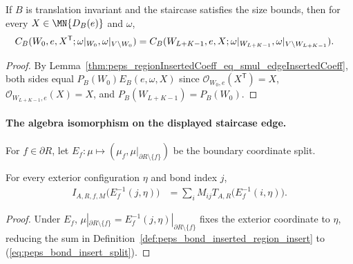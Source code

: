\begin{lemma}%
    \label{thm:peps_end_window_identity_staircase_virtual_operation}
    \leanok
    If $B$ is translation invariant and the staircase satisfies the size bounds,
    then for every $X\in\MN{D_B(e)}$ and $\omega$,
    \begin{align}
        C_B(W_0,e,X^{\mathsf T};\omega|_{W_0},
        \omega|_{V\setminus W_0})
         & =
        C_B(W_{L+K-1},e,X;\omega|_{W_{L+K-1}},
        \omega|_{V\setminus W_{L+K-1}}).
        \notag
    \end{align}
\end{lemma}
\begin{proof}
    \leanok
    By Lemma~\ref{thm:peps_regionInsertedCoeff_eq_smul_edgeInsertedCoeff},
    both sides equal $P_B(W_0)E_B(e,\omega,X)$ since
    $\mathcal O_{W_0,e}(X^{\mathsf T})=X$, $\mathcal O_{W_{L+K-1},e}(X)=X$, and
    $P_B(W_{L+K-1})=P_B(W_0)$.
\end{proof}

\paragraph{The algebra isomorphism on the displayed staircase edge.}

\begin{definition}%
    \label{def:peps_boundary_split}
    \leanok
    For $f\in\partial R$, let $E_f:\mu\mapsto(\mu_f,\mu|_{\partial R\setminus\{f\}})$
    be the boundary coordinate split.
\end{definition}

\begin{lemma}%
    \label{thm:peps_bond_insert_split}
    \leanok
    For every exterior configuration $\eta$ and bond index $j$,
    \begin{align}
        I_{A,R,f,M}\bigl(E_f^{-1}(j,\eta)\bigr)
         & =\sum_i M_{ij}T_{A,R}\bigl(E_f^{-1}(i,\eta)\bigr).
        \label{eq:peps_bond_insert_split}
    \end{align}
\end{lemma}
\begin{proof}
    \leanok
    Under $E_f$, $\mu|_{\partial R\setminus\{f\}}=E_f^{-1}(j,\eta)|_{\partial R\setminus\{f\}}$
    fixes the exterior coordinate to $\eta$, reducing the sum in
    Definition~\ref{def:peps_bond_inserted_region_insert} to
    (\ref{eq:peps_bond_insert_split}).
\end{proof}

